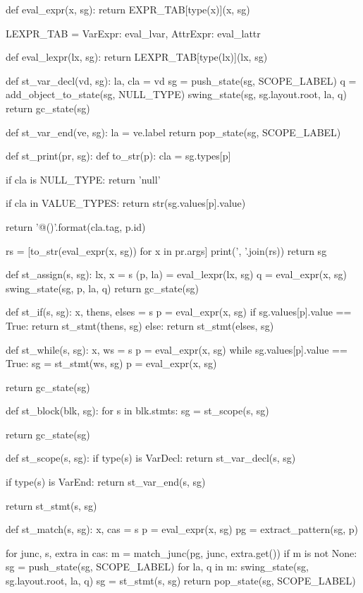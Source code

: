 \begin{dispPy}
def eval_expr(x, sg):
    return EXPR_TAB[type(x)](x, sg)

LEXPR_TAB = {
    VarExpr: eval_lvar,
    AttrExpr: eval_lattr}

def eval_lexpr(lx, sg):
    return LEXPR_TAB[type(lx)](lx, sg)

def st_var_decl(vd, sg):
    la, cla = vd
    sg = push_state(sg, SCOPE_LABEL)
    q = add_object_to_state(sg, NULL_TYPE)
    swing_state(sg, sg.layout.root, la, q)
    return gc_state(sg)

def st_var_end(ve, sg):
    la = ve.label
    return pop_state(sg, SCOPE_LABEL)

def st_print(pr, sg):
    def to_str(p):
        cla = sg.types[p]

        if cla is NULL_TYPE:
            return 'null'

        if cla in VALUE_TYPES:
            return str(sg.values[p].value)

        return '{}@({})'.format(cla.tag, p.id)

    rs = [to_str(eval_expr(x, sg)) for x in pr.args]
    print(', '.join(rs))
    return sg

def st_assign(s, sg):
    lx, x = s
    (p, la) = eval_lexpr(lx, sg)
    q = eval_expr(x, sg)
    swing_state(sg, p, la, q)
    return gc_state(sg)

def st_if(s, sg):
    x, thens, elses = s
    p = eval_expr(x, sg)
    if sg.values[p].value == True:
        return st_stmt(thens, sg)
    else:
        return st_stmt(elses, sg)

def st_while(s, sg):
    x, ws = s
    p = eval_expr(x, sg)
    while sg.values[p].value == True:
        sg = st_stmt(ws, sg)
        p = eval_expr(x, sg)

    return gc_state(sg)

def st_block(blk, sg):
    for s in blk.stmts:
        sg = st_scope(s, sg)

    return gc_state(sg)

def st_scope(s, sg):
    if type(s) is VarDecl:
        return st_var_decl(s, sg)

    if type(s) is VarEnd:
        return st_var_end(s, sg)

    return st_stmt(s, sg)

def st_match(s, sg):
    x, cas = s
    p = eval_expr(x, sg)
    pg = extract_pattern(sg, p)

    for junc, s, extra in cas:
        m = match_junc(pg, junc, extra.get())
        if m is not None:
            sg = push_state(sg, SCOPE_LABEL)
            for la, q in m:
                swing_state(sg, sg.layout.root, la, q)
            sg = st_stmt(s, sg)
            return pop_state(sg, SCOPE_LABEL)


\end{dispPy}
